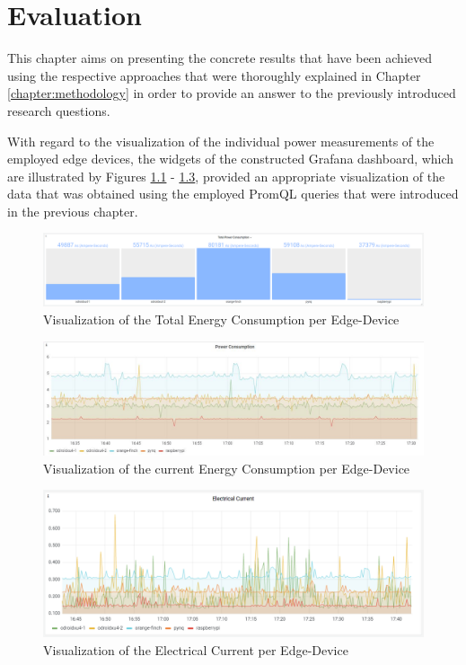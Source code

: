 \chapter{Evaluation}\label{chapter:evaluation}

This chapter aims on presenting the concrete results that have been achieved using the respective approaches that were thoroughly explained in Chapter \ref{chapter:methodology} in order to provide an answer to the previously introduced research questions.

With regard to the visualization of the individual power measurements of the employed edge devices, the widgets of the constructed Grafana dashboard, which are illustrated by Figures \ref{fig:dashboard-total-power-consumption} - \ref{fig:dashboard-current}, provided an appropriate visualization of the data that was obtained using the employed PromQL queries that were introduced in the previous chapter. 

\begin{figure}[H]
    \centering
    \includegraphics[width=\textwidth]{./figures/total_power_consumption}
    \caption{Visualization of the Total Energy Consumption per Edge-Device}
    \label{fig:dashboard-total-power-consumption}
\end{figure}

\begin{figure}[H]
    \centering
    \includegraphics[width=\textwidth]{./figures/test}
    \caption{Visualization of the current Energy Consumption per Edge-Device}
    \label{fig:dashboard-power-consumption}
\end{figure}

\begin{figure}[H]
    \centering
    \includegraphics[width=\textwidth]{./figures/current}
    \caption{Visualization of the Electrical Current per Edge-Device}
    \label{fig:dashboard-current}
\end{figure}

